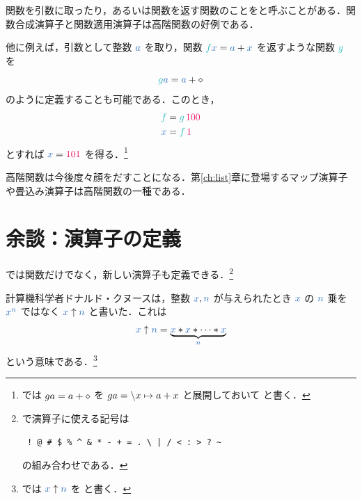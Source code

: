 \documentclass[a5paper,twoside,fleqn,draft]{jsbook}
\begin{document}
関数を引数に取ったり，あるいは関数を返す関数のことをと呼ぶことがある．関数合成演算子と関数適用演算子は高階関数の好例である．

他に例えば，引数として整数 $\hVar{a}$ を取り，関数 $\hFunc{f}\hVar{x}=\hVar{a}+\hVar{x}$ を返すような関数 $\hFunc{g}$ を
\begin{equation}
  \hFunc{g}\hVar{a}
  =\hVar{a}+\hAnonParam
\end{equation}
のように定義することも可能である．このとき，
\begin{align}
  \hFunc{f}
  &=\hFunc{g}\,\hConstant{100}\\
  \hVar{x}
  &=\hFunc{f}\,\hConstant{1}
\end{align}
とすれば $\hVar{x}=\hConstant{101}$ を得る．\footnote{\haskell では $ga=a+\diamond$ を $ga=\backslash x\mapsto a+x$ と展開しておいて  と書く．}

高階関数は今後度々顔をだすことになる．第\ref{ch:list}章に登場するマップ演算子や畳込み演算子は高階関数の一種である．

\section{余談：演算子の定義}

\haskell では関数だけでなく，新しい演算子も定義できる．\footnote{\haskell で演算子に使える記号は
\begin{verbatim}
 ! @ # $ % ^ & * - + = . \ | / < : > ? ~
\end{verbatim}%
の組み合わせである．}


計算機科学者ドナルド・クヌースは，整数 $\hVar{x},\hVar{n}$ が与えられたとき $\hVar{x}$ の $\hVar{n}$ 乗を ${\hVar{x}}^{\hVar{n}}$ ではなく $\hVar{x}\uparrow\hVar{n}$ と書いた．これは
\begin{equation}
  \hVar{x}\uparrow\hVar{n}
  =\underbrace{\hVar{x}*\hVar{x}*\dotsb*\hVar{x}}_{\hVar{n}}
\end{equation}
という意味である．\footnote{\haskell では $\hVar{x}\uparrow\hVar{n}$ を  と書く．}
\end{document}
